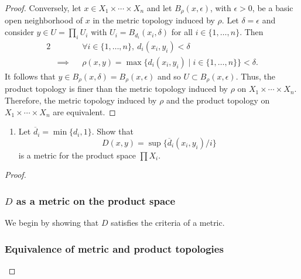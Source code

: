 \begin{solution}
\begin{proof}
    Conversely, let $x \in X_1 \times \cdots \times X_n$ and let $B_\rho(x, \epsilon)$, with $\epsilon > 0$, be a basic open neighborhood of $x$ in the metric topology induced by $\rho$.
    Let $\delta = \epsilon$ and consider $y \in U = \prod_i U_i$ with $U_i = B_{d_i}(x_i, \delta)$ for all $i \in \{1, \ldots, n\}$.
    Then
    \begin{alignat*}{2}
      &           && \forall i \in \{1, \ldots, n\},~ d_i(x_i, y_i) < \delta \\
      & \implies  && \rho(x, y) = \max\{ d_i(x_i, y_i) \mid i \in \{1, \ldots, n\} \} < \delta. 
    \end{alignat*}
    It follows that $y \in B_\rho(x, \delta) = B_\rho(x, \epsilon)$ and so $U \subset B_\rho(x, \epsilon)$.
    Thus, the product topology is finer than the metric topology induced by $\rho$ on $X_1 \times \cdots \times X_n$.
    Therefore, the metric topology induced by $\rho$ and the product topology on $X_1 \times \cdots \times X_n$ are equivalent.
  \end{proof}
  \bigskip

  \begin{enumerate}[label={(\alph*)}, align=left, leftmargin=\parindent, listparindent=\parindent, labelwidth=0pt, itemindent=!]
    \addtocounter{enumi}{1} 
    \item
      Let $\overline{d}_i = \min\{ d_i, 1 \}$.
      Show that
      \begin{equation*}
        D(x, y) = \sup\{ \overline{d}_i(x_i, y_i) / i \}
      \end{equation*}
      is a metric for the product space $\prod X_i$.
  \end{enumerate}
  \begin{proof}~

    \subsubsection*{$D$ as a metric on the product space}
    We begin by showing that $D$ satisfies the criteria of a metric.

    \subsubsection*{Equivalence of metric and product topologies}
  \end{proof}
\end{solution}

